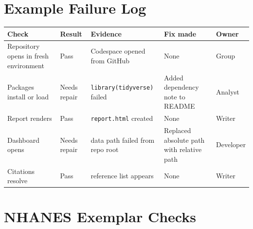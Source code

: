 \documentclass[
  letterpaper,
  DIV=11,
  numbers=noendperiod,
  oneside]{scrreprt}
\begin{document}
\section*{Example Failure Log}\label{example-failure-log}


\begin{longtable}[]{@{}
  >{\raggedright\arraybackslash}p{}
  >{\raggedright\arraybackslash}p{}
  >{\raggedright\arraybackslash}p{}
  >{\raggedright\arraybackslash}p{}
  >{\raggedright\arraybackslash}p{}@{}}
\toprule\noalign{}
\begin{minipage}[b]{\linewidth}\raggedright
Check
\end{minipage} & \begin{minipage}[b]{\linewidth}\raggedright
Result
\end{minipage} & \begin{minipage}[b]{\linewidth}\raggedright
Evidence
\end{minipage} & \begin{minipage}[b]{\linewidth}\raggedright
Fix made
\end{minipage} & \begin{minipage}[b]{\linewidth}\raggedright
Owner
\end{minipage} \\
\midrule\noalign{}
\endhead
\bottomrule\noalign{}
\endlastfoot
Repository opens in fresh environment & Pass & Codespace opened from
GitHub & None & Group \\
Packages install or load & Needs repair & \texttt{library(tidyverse)}
failed & Added dependency note to README & Analyst \\
Report renders & Pass & \texttt{report.html} created & None & Writer \\
Dashboard opens & Needs repair & data path failed from repo root &
Replaced absolute path with relative path & Developer \\
Citations resolve & Pass & reference list appears & None & Writer \\
\end{longtable}

\section*{NHANES Exemplar Checks}\label{nhanes-exemplar-checks}
\end{document}

